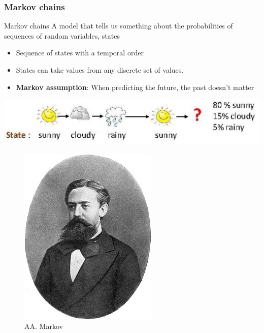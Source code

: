 \documentclass[13.5pt,aspecratio=169]{beamer}
\begin{document}
\begin{frame}
    \onehalfspacing
        \frametitle{Markov chains}
    \begin{minipage}{0.62\textwidth}

        \begin{block}{Markov chains}
            A model that tells us something about the probabilities of sequences of random variables, states
        \end{block}

        \begin{itemize}
            \item Sequence of states with a temporal order
            \item States can take values from any discrete set of values.
            \item \textbf{Markov assumption}:
            When predicting the future, the past doesn’t matter
        \end{itemize}
        \includegraphics[width=1\textwidth]{Rain_Prediction.png}
    \end{minipage}
    \begin{minipage}{0.3\textwidth}
        \begin{figure}
            \includegraphics[scale=0.5]{AAMarkov.jpg}
            \caption{AA. Markov}
        \end{figure}
        
    \end{minipage}
        
\end{frame}
\end{document}
